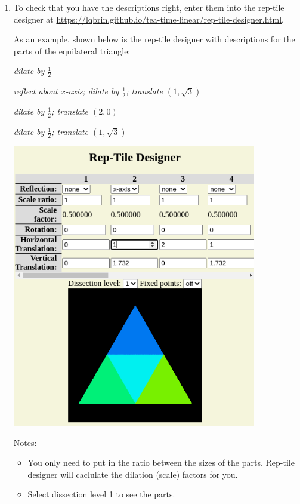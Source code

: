 \begin{enumerate}
    \item To check that you have the descriptions right, enter them into the rep-tile designer at \hyperlink{https://lqbrin.github.io/tea-time-linear/rep-tile-designer.html}{https://lqbrin.github.io/tea-time-linear/rep-tile-designer.html}. \par \bigskip\noindent As an example, shown below is the rep-tile designer with descriptions for the parts of the equilateral triangle:
    \par \textit{dilate by $\frac12$}
    \par \textit{reflect about $x$-axis; dilate by $\frac12$; translate $(1,\sqrt3)$}
    \par \textit{dilate by $\frac12$; translate $(2,0)$}
    \par \textit{dilate by $\frac12$; translate $(1,\sqrt3)$}
    \begin{center}
        \includegraphics[width=4.2in]{images/rep-tile-designer}
    \end{center}
    Notes:
    \begin{itemize}
        \item You only need to put in the ratio between the sizes of the parts. Rep-tile designer will caclulate the dilation (scale) factors for you.
        \item Select dissection level 1 to see the parts.
    \end{itemize}
\end{enumerate}

